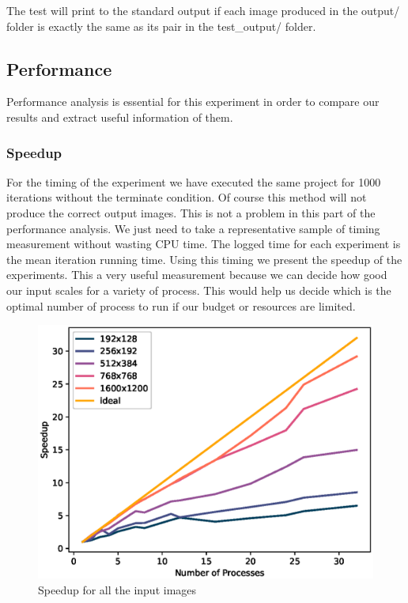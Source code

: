 \documentclass[12pt,a4paper]{article}
\begin{document}
        The test will print to the standard output if each image produced in the output/ folder is exactly the same as its pair in the test\_output/ folder.

    \subsection{Performance}
        Performance analysis is essential for this experiment in order to compare our results and extract useful information of them.

        \subsubsection{Speedup}
            For the timing of the experiment we have executed the same project for 1000 iterations without the terminate condition. Of course this method will not produce the correct output images. This is not a problem in this part of the performance analysis. We just need to take a representative sample of timing measurement without wasting CPU time. The logged time for each experiment is the mean iteration running time. Using this timing we present the speedup of the experiments. This a very useful measurement because we can decide how good our input scales for a variety of process. This would help us decide which is the optimal number of process to run if our budget or resources are limited.

            \begin{figure}[ht]
                \centering
                \includegraphics[scale=0.8]{../graphs/Speedup.eps}
                \caption{Speedup for all the input images}
                \label{speedup}
            \end{figure}
\end{document}
